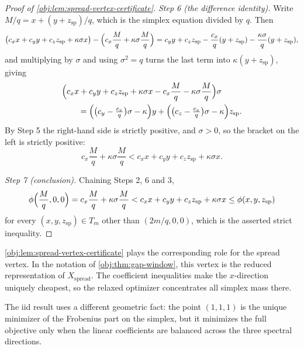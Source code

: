 \documentclass[11pt]{article}
\begin{document}
\begin{proof}[Proof of \cref{obj:lem:spread-vertex-certificate}]
\emph{Step 6 (the difference identity).}  Write \(M/q=x+(y+z_{\mathrm{sp}})/q\), which is the simplex equation divided by \(q\).  Then
\[
\bigl(c_xx+c_yy+c_zz_{\mathrm{sp}}+\kappa\sigma x\bigr)
-\Bigl(c_x\frac Mq+\kappa\sigma\frac Mq\Bigr)
=c_yy+c_zz_{\mathrm{sp}}-\frac{c_x}{q}(y+z_{\mathrm{sp}})-\frac{\kappa\sigma}{q}(y+z_{\mathrm{sp}}),
\]
and multiplying by \(\sigma\) and using \(\sigma^2=q\) turns the last term into \(\kappa(y+z_{\mathrm{sp}})\), giving
\[
\begin{aligned}
&\Bigl(c_xx+c_yy+c_zz_{\mathrm{sp}}+\kappa\sigma x
-c_x\frac Mq-\kappa\sigma\frac Mq\Bigr)\sigma\\
&\qquad=\Bigl(\bigl(c_y-\tfrac{c_x}{q}\bigr)\sigma-\kappa\Bigr)y
+\Bigl(\bigl(c_z-\tfrac{c_x}{q}\bigr)\sigma-\kappa\Bigr)z_{\mathrm{sp}} .
\end{aligned}
\]
By Step 5 the right-hand side is strictly positive, and \(\sigma>0\), so the bracket on the left is strictly positive:
\[
c_x\frac Mq+\kappa\sigma\frac Mq<c_xx+c_yy+c_zz_{\mathrm{sp}}+\kappa\sigma x .
\]

\emph{Step 7 (conclusion).}  Chaining Steps 2, 6 and 3,
\[
\phi\Bigl(\frac Mq,0,0\Bigr)
=c_x\frac Mq+\kappa\sigma\frac Mq
<c_xx+c_yy+c_zz_{\mathrm{sp}}+\kappa\sigma x
\le\phi(x,y,z_{\mathrm{sp}})
\]
for every \((x,y,z_{\mathrm{sp}})\in T_m\) other than \((2m/q,0,0)\), which is the asserted strict inequality. %
\end{proof}

\cref{obj:lem:spread-vertex-certificate} plays the corresponding role for the spread vertex. In the notation of \cref{obj:thm:gap-window}, this vertex is the reduced representation of \(X_{\mathrm{spread}}\). The coefficient inequalities make the \(x\)-direction uniquely cheapest, so the relaxed optimizer concentrates all simplex mass there.

The iid result uses a different geometric fact: the point \((1,1,1)\) is the unique minimizer of the Frobenius part on the simplex, but it minimizes the full objective only when the linear coefficients are balanced across the three spectral directions.
\end{document}
